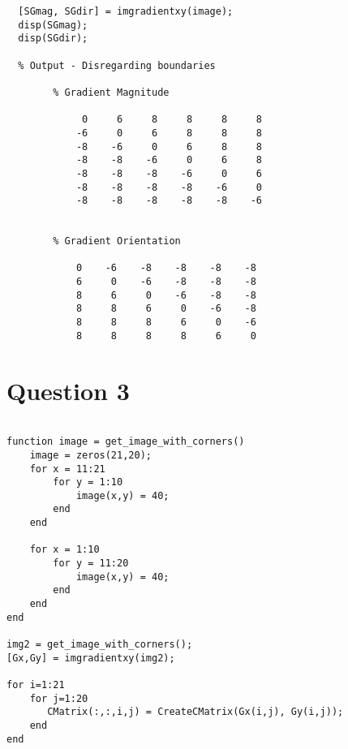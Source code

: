 \documentclass{article}
\begin{document}
\begin{verbatim}
  [SGmag, SGdir] = imgradientxy(image);
  disp(SGmag);
  disp(SGdir);

  % Output - Disregarding boundaries

        % Gradient Magnitude

             0     6     8     8     8     8     
            -6     0     6     8     8     8     
            -8    -6     0     6     8     8     
            -8    -8    -6     0     6     8     
            -8    -8    -8    -6     0     6     
            -8    -8    -8    -8    -6     0     
            -8    -8    -8    -8    -8    -6    


        % Gradient Orientation            

            0    -6    -8    -8    -8    -8    
            6     0    -6    -8    -8    -8    
            8     6     0    -6    -8    -8    
            8     8     6     0    -6    -8    
            8     8     8     6     0    -6    
            8     8     8     8     6     0    
\end{verbatim}


\section{Question 3}

\begin{verbatim}

function image = get_image_with_corners()
    image = zeros(21,20);
    for x = 11:21
        for y = 1:10
            image(x,y) = 40;
        end
    end
    
    for x = 1:10
        for y = 11:20
            image(x,y) = 40;
        end
    end    
end

img2 = get_image_with_corners();
[Gx,Gy] = imgradientxy(img2);

for i=1:21
    for j=1:20
       CMatrix(:,:,i,j) = CreateCMatrix(Gx(i,j), Gy(i,j)); 
    end
end
  
\end{verbatim}  
\end{document}
